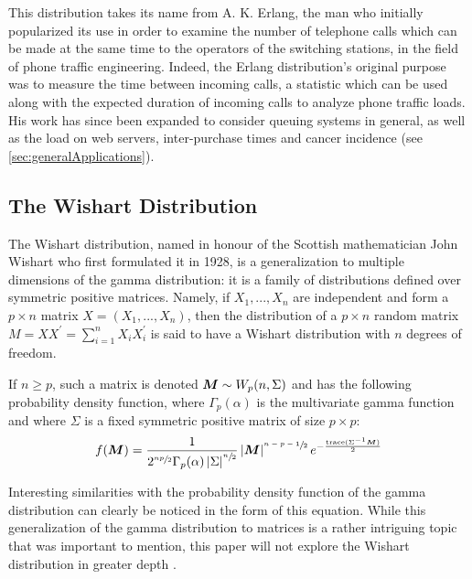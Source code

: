 \documentclass[12pt]{article}
\begin{document}
This distribution takes its name from A. K. Erlang, the man who initially popularized its use in order to examine the
number of telephone calls which can be made at the same time to the operators of the switching stations, in the field of
phone traffic engineering. Indeed, the Erlang distribution's original purpose was to measure the time between incoming
calls, a statistic which can be used along with the expected duration of incoming calls to analyze phone traffic loads.
His work has since been expanded to consider queuing systems in general, as well as the load on web servers,
inter-purchase times and cancer incidence (see \autoref{sec:generalApplications})\cite{zachWhatErlangDistribution2020}.


\pagebreak
\subsection{The Wishart Distribution}
The Wishart distribution, named in honour of the Scottish mathematician John Wishart who first formulated it in 1928, is
a generalization to multiple dimensions of the gamma distribution: it is a family of distributions defined over symmetric
positive matrices. Namely, if $X_1, ..., X_n$ are independent and form a $p\times n$ matrix $X = (X_1, ..., X_n)$, then
the distribution of a $p\times n$ random matrix $M = XX^\prime = \sum^n_{i=1}X_iX^\prime_i$ is said to have a Wishart
distribution with $n$ degrees of freedom.

If $n\geq p$, such a matrix is denoted $\bm{M}\sim W_p(n, \Sigma)$ and has the following probability density function,
where $\Gamma_p(\alpha)$ is the multivariate gamma function and where $\Sigma$ is a fixed symmetric positive matrix of
size $p \times p$:
\begin{equation}
	f(\bm{M}) = \frac{1}{2^{\sfrac{np}{2}}\Gamma_p(\alpha)\left|\Sigma\right|^{\sfrac{n}{2}}}\left|\bm{M}\right|^{\sfrac{n-p-1}{2}}e^{-\frac{\text{trace}(\Sigma^{-1}\bm{M})}{2}}
\end{equation}

Interesting similarities with the probability density function of the gamma distribution can clearly be noticed in the
form of this equation. While this generalization of the gamma distribution to matrices is a rather intriguing topic that
was important to mention, this paper will not explore the Wishart distribution in greater depth
\cite{wikipediaWishartDistribution2022}.
\end{document}
